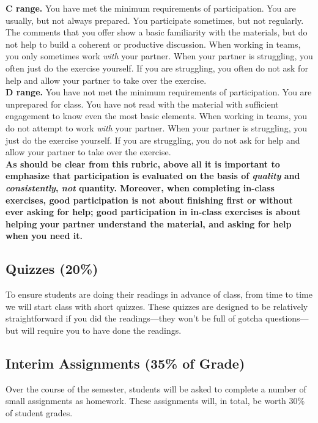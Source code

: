 \documentclass[12pt]{article}
\begin{document}
\textbf{C range.}  You have met the minimum requirements of participation.  You are usually, but not always prepared.  You participate sometimes, but not regularly.  The comments that you offer show a basic familiarity with the materials, but do not help to build a coherent or productive discussion.  When working in teams, you only sometimes work \emph{with} your partner. When your partner is struggling, you often just do the exercise yourself. If you are struggling, you often do not ask for help and allow your partner to take over the exercise. \\

\textbf{D range.}  You have not met the minimum requirements of participation.  You are unprepared for class.  You have not read with the material with sufficient engagement to know even the most basic elements.  When working in teams, you do not attempt to work \emph{with} your partner. When your partner is struggling, you just do the exercise yourself. If you are struggling, you do not ask for help and allow your partner to take over the exercise.\\

\textbf{As should be clear from this rubric, above all it is important to emphasize that participation is evaluated on the basis of \emph{quality} and \emph{consistently}, \emph{not} quantity. Moreover, when completing in-class exercises, good participation is not about finishing first or without ever asking for help; good participation in in-class exercises is about helping your partner understand the material, and asking for help when you need it.}

\subsection{Quizzes (20\%)}

To ensure students are doing their readings in advance of class, from time to time we will start class with short quizzes. These quizzes are designed to be relatively straightforward if you did the readings—they won't be full of gotcha questions—but will require you to have done the readings.

\subsection{Interim Assignments (35\% of Grade)}

Over the course of the semester, students will be asked to complete a number of small assignments as homework. These assignments will, in total, be worth 30\% of student grades.
\end{document}
